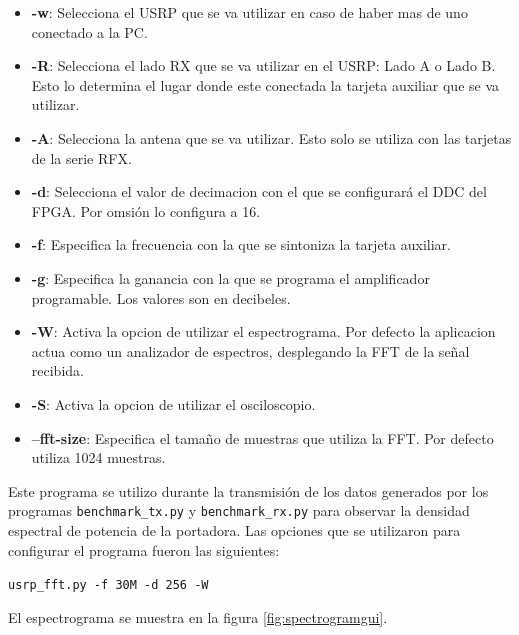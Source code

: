 \begin{itemize}
  \item \textbf{-w}: Selecciona el USRP que se va utilizar en caso de haber mas de uno conectado a
  la PC.
  \item \textbf{-R}: Selecciona el lado RX que se va utilizar en el USRP: Lado A o Lado B. Esto lo
  determina el lugar donde este conectada la tarjeta auxiliar que se va utilizar.
  \item \textbf{-A}: Selecciona la antena que se va utilizar. Esto solo se utiliza con las tarjetas
  de la serie RFX.
  \item \textbf{-d}: Selecciona el valor de decimacion con el que se configurar\'a el DDC del FPGA.
  Por omsi\'on lo configura a 16.
  \item \textbf{-f}: Especifica la frecuencia con la que se sintoniza la tarjeta auxiliar.
  \item \textbf{-g}: Especifica la ganancia con la que se programa el amplificador programable. Los
  valores son en decibeles.
  \item \textbf{-W}: Activa la opcion de utilizar el espectrograma. Por defecto la aplicacion actua
  como un analizador de espectros, desplegando la FFT de la se\~nal recibida.
  \item \textbf{-S}: Activa la opcion de utilizar el osciloscopio.
  \item \textbf{--fft-size}: Especifica el tama\~no de muestras que utiliza la FFT. Por defecto
  utiliza 1024 muestras.
\end{itemize} 

Este programa se utilizo durante la transmisi\'on de los datos generados por los programas
\verb|benchmark_tx.py| y \verb|benchmark_rx.py| para observar la densidad espectral de potencia de
la portadora. Las opciones que se utilizaron para configurar el programa fueron las siguientes:

\begin{center}
\verb|usrp_fft.py -f 30M -d 256 -W|
\end{center}

El espectrograma se muestra en la figura \ref{fig:spectrogramgui}.

